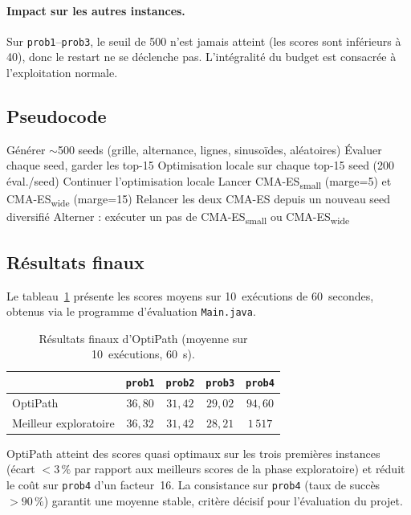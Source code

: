 \paragraph{Impact sur les autres instances.}
Sur \texttt{prob1}--\texttt{prob3}, le seuil de 500 n'est jamais atteint (les
scores sont inférieurs à 40), donc le restart ne se déclenche pas.  L'intégralité
du budget est consacrée à l'exploitation normale.

\subsection{Pseudocode}

\begin{algorithm}[H]
\caption{OptiPath — Portfolio CMA-ES avec restart adaptatif}
\begin{algorithmic}[1]
  \State Générer $\sim$500 seeds (grille, alternance, lignes, sinusoïdes, aléatoires)
  \State Évaluer chaque seed, garder les top-15
  \State Optimisation locale sur chaque top-15 seed (200 éval./seed)
\EndProcedure
{}
    \State Continuer l'optimisation locale
    \State \Return
  \EndIf
    \State Lancer CMA-ES\textsubscript{small} (marge=5) et CMA-ES\textsubscript{wide} (marge=15)
  \EndIf
    \State Relancer les deux CMA-ES depuis un nouveau seed diversifié
  \EndIf
  \State Alterner : exécuter un pas de CMA-ES\textsubscript{small} ou CMA-ES\textsubscript{wide}
\EndProcedure
\end{algorithmic}
\end{algorithm}

\subsection{Résultats finaux}

Le tableau~\ref{tab:resultats-finaux} présente les scores moyens sur 10~exécutions
de 60~secondes, obtenus via le programme d'évaluation \texttt{Main.java}.

\begin{table}[H]
\centering
\caption{Résultats finaux d'OptiPath (moyenne sur 10~exécutions, 60~s).}
\label{tab:resultats-finaux}
\begin{tabular}{lcccc}
\toprule
  & \texttt{prob1} & \texttt{prob2} & \texttt{prob3} & \texttt{prob4} \\
\midrule
OptiPath & $36{,}80$ & $31{,}42$ & $29{,}02$ & $94{,}60$ \\
\midrule
Meilleur exploratoire & $36{,}32$ & $31{,}42$ & $28{,}21$ & $1\,517$ \\
\bottomrule
\end{tabular}
\end{table}

OptiPath atteint des scores quasi optimaux sur les trois premières instances
(écart $<3\,\%$ par rapport aux meilleurs scores de la phase exploratoire) et
réduit le coût sur \texttt{prob4} d'un facteur~16.  La consistance sur
\texttt{prob4} (taux de succès $>90\,\%$) garantit une moyenne stable, critère
décisif pour l'évaluation du projet.
